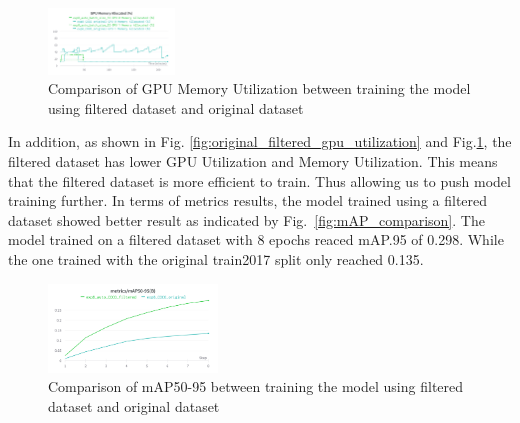 \documentclass[conference]{IEEEtran}
\begin{document}
\begin{figure}[h!]
\centering
\includegraphics[width=0.3\textwidth,keepaspectratio]{memory_utilization_comparison_original_and_filtered.png}
\caption{Comparison of GPU Memory Utilization between training the model using filtered dataset and original dataset}
\label{fig:original_filtered_memory_utilization}
\end{figure}
In addition, as shown in Fig. \ref{fig:original_filtered_gpu_utilization} and Fig.\ref{fig:original_filtered_memory_utilization}, the filtered dataset has lower GPU Utilization and Memory Utilization. This means that the filtered dataset is more efficient to train.
Thus allowing us to push model training further.
In terms of metrics results, the model trained using a filtered dataset showed better result as indicated by Fig.~\ref{fig:mAP_comparison}. The model trained on a filtered dataset with 8 epochs reaced mAP.95 of 0.298. While the one trained with the original train2017 split only reached 0.135.
\begin{figure}
    \centering
    \includegraphics[width=0.4\textwidth,keepaspectratio]{comparison_mAP_filtered.png}
    \caption{Comparison of mAP50-95 between training the model using filtered dataset and original dataset}
\end{figure}
\end{document}
